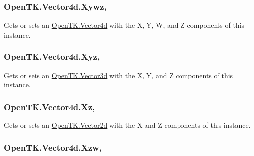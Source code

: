 \hypertarget{struct_open_t_k_1_1_vector4d_afed3244397fa89920cf800221490e988}{
\subsubsection[{Xywz}]{ Open\-T\-K.\-Vector4d.\-Xywz\hspace{0.3cm}{\ttfamily [get]}, {\ttfamily [set]}}}\label{struct_open_t_k_1_1_vector4d_afed3244397fa89920cf800221490e988}


Gets or sets an \hyperlink{struct_open_t_k_1_1_vector4d}{Open\-T\-K.\-Vector4d} with the X, Y, W, and Z components of this instance. 

\hypertarget{struct_open_t_k_1_1_vector4d_ac07b2f14a4b949711001d3e67ff37991}{
\subsubsection[{Xyz}]{ Open\-T\-K.\-Vector4d.\-Xyz\hspace{0.3cm}{\ttfamily [get]}, {\ttfamily [set]}}}\label{struct_open_t_k_1_1_vector4d_ac07b2f14a4b949711001d3e67ff37991}


Gets or sets an \hyperlink{struct_open_t_k_1_1_vector3d}{Open\-T\-K.\-Vector3d} with the X, Y, and Z components of this instance. 

\hypertarget{struct_open_t_k_1_1_vector4d_ae7d2a85a63e048b3acd04ee07d2913d2}{
\subsubsection[{Xz}]{ Open\-T\-K.\-Vector4d.\-Xz\hspace{0.3cm}{\ttfamily [get]}, {\ttfamily [set]}}}\label{struct_open_t_k_1_1_vector4d_ae7d2a85a63e048b3acd04ee07d2913d2}


Gets or sets an \hyperlink{struct_open_t_k_1_1_vector2d}{Open\-T\-K.\-Vector2d} with the X and Z components of this instance. 

\hypertarget{struct_open_t_k_1_1_vector4d_a5a5310d719755ec2771ca67aa51ed7e6}{
\subsubsection[{Xzw}]{ Open\-T\-K.\-Vector4d.\-Xzw\hspace{0.3cm}{\ttfamily [get]}, {\ttfamily [set]}}}\label{struct_open_t_k_1_1_vector4d_a5a5310d719755ec2771ca67aa51ed7e6}



